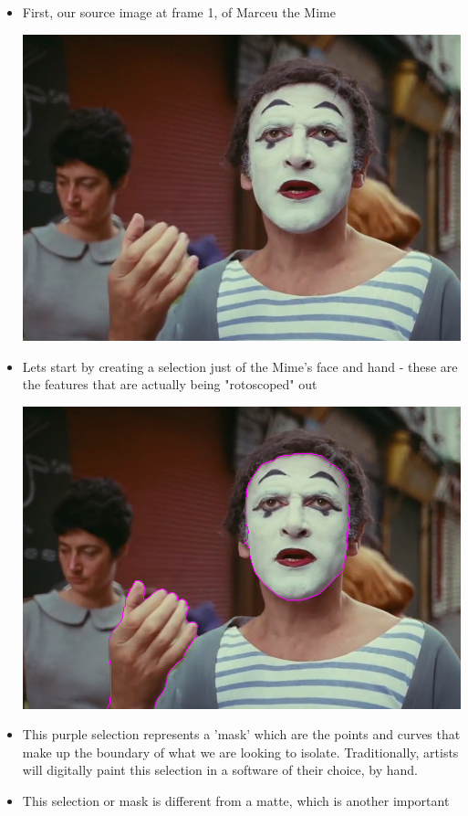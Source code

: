 \documentclass[11pt]{article}
\begin{document}
\begin{itemize}
\item First, our source image at frame 1, of Marceu the Mime
\begin{center}
\includegraphics[width=.9\linewidth]{./roto/Capture.PNG}
\end{center}
\item Lets start by creating a selection just of the Mime's face and hand - these
are the features that are actually being "rotoscoped" out
\begin{center}
\includegraphics[width=.9\linewidth]{./roto/masked.PNG}
\end{center}
\item This purple selection represents a 'mask' which are the points and curves that
make up the boundary of what we are looking to isolate. Traditionally, artists
will digitally paint this selection in a software of their choice, by hand.
\item This selection or mask is different from a matte, which is another important

\end{itemize}
\end{document}

